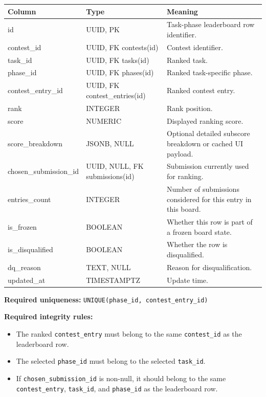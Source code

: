 \documentclass[11pt,a4paper]{article}
\begin{document}
\begin{longtable}{>{\raggedright\arraybackslash}p{} >{\raggedright\arraybackslash}p{} >{\raggedright\arraybackslash}p{}}
\toprule
\textbf{Column} & \textbf{Type} & \textbf{Meaning} \\
\midrule
id & UUID, PK & Task-phase leaderboard row identifier. \\
contest\_id & UUID, FK contests(id) & Contest identifier. \\
task\_id & UUID, FK tasks(id) & Ranked task. \\
phase\_id & UUID, FK phases(id) & Ranked task-specific phase. \\
contest\_entry\_id & UUID, FK contest\_entries(id) & Ranked contest entry. \\
rank & INTEGER & Rank position. \\
score & NUMERIC & Displayed ranking score. \\
score\_breakdown & JSONB, NULL & Optional detailed subscore breakdown or cached UI payload. \\
chosen\_submission\_id & UUID, NULL, FK submissions(id) & Submission currently used for ranking. \\
entries\_count & INTEGER & Number of submissions considered for this entry in this board. \\
is\_frozen & BOOLEAN & Whether this row is part of a frozen board state. \\
is\_disqualified & BOOLEAN & Whether the row is disqualified. \\
dq\_reason & TEXT, NULL & Reason for disqualification. \\
updated\_at & TIMESTAMPTZ & Update time. \\
\bottomrule
\end{longtable}

\textbf{Required uniqueness:} \texttt{UNIQUE(phase\_id, contest\_entry\_id)}

\textbf{Required integrity rules:}
\begin{itemize}
    \item The ranked \texttt{contest\_entry} must belong to the same \texttt{contest\_id} as the leaderboard row.
    \item The selected \texttt{phase\_id} must belong to the selected \texttt{task\_id}.
    \item If \texttt{chosen\_submission\_id} is non-null, it should belong to the same \texttt{contest\_entry}, \texttt{task\_id}, and \texttt{phase\_id} as the leaderboard row.
\end{itemize}
\end{document}
